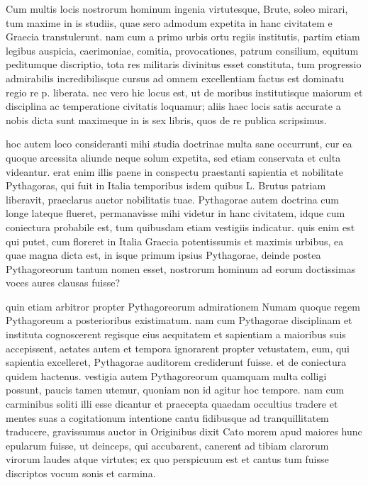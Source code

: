  Cum multis locis nostrorum hominum ingenia virtutesque, Brute, soleo mirari, tum maxime in is studiis, quae sero admodum expetita in hanc civitatem e Graecia transtulerunt. nam cum a primo urbis ortu regiis institutis, partim etiam legibus auspicia, caerimoniae, comitia, provocationes, patrum consilium, equitum peditumque discriptio, tota res militaris divinitus esset constituta, tum progressio admirabilis incredibilisque cursus ad omnem excellentiam factus est dominatu regio re p. liberata. nec vero hic locus est, ut de moribus institutisque maiorum et disciplina ac temperatione civitatis loquamur; aliis haec locis satis accurate a nobis dicta sunt maximeque in is sex libris, quos de re publica scripsimus.

 hoc autem loco consideranti mihi studia doctrinae multa sane occurrunt, cur ea quoque arcessita aliunde neque solum expetita, sed etiam conservata et culta videantur. erat enim illis paene in conspectu praestanti sapientia et nobilitate Pythagoras, qui fuit in Italia temporibus isdem quibus L. Brutus patriam liberavit, praeclarus auctor nobilitatis tuae. Pythagorae autem doctrina cum longe lateque flueret, permanavisse mihi videtur in hanc civitatem, idque cum coniectura probabile est, tum quibusdam etiam vestigiis indicatur. quis enim est qui putet, cum floreret in Italia Graecia potentissumis et maximis urbibus, ea quae magna dicta est, in isque primum ipsius Pythagorae, deinde postea Pythagoreorum tantum nomen esset, nostrorum hominum ad eorum doctissimas voces aures clausas fuisse?

 quin etiam arbitror propter Pythagoreorum admirationem Numam quoque regem Pythagoreum a posterioribus existimatum. nam cum Pythagorae disciplinam et instituta cognoscerent regisque eius aequitatem et sapientiam a maioribus suis accepissent, aetates autem et tempora ignorarent propter vetustatem, eum, qui sapientia excelleret, Pythagorae auditorem crediderunt fuisse. et de coniectura quidem hactenus. vestigia autem Pythagoreorum quamquam multa colligi possunt, paucis tamen utemur, quoniam non id agitur hoc tempore. nam cum carminibus soliti illi esse dicantur et praecepta quaedam occultius tradere et mentes suas a cogitationum intentione cantu fidibusque ad tranquillitatem traducere, gravissumus auctor in Originibus dixit Cato morem apud maiores hunc epularum fuisse, ut deinceps, qui accubarent, canerent ad tibiam clarorum virorum laudes atque virtutes; ex quo perspicuum est et cantus tum fuisse discriptos vocum sonis et carmina.

